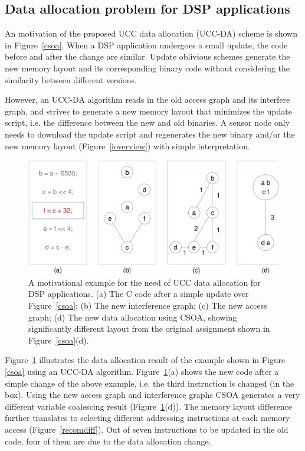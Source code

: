 \subsection{Data allocation problem for DSP applications}

An motivation of the proposed UCC data allocation (UCC-DA) scheme is shown in  Figure~\ref{csoa}. When a DSP 
application undergoes a small update, the code before and after the change are similar. Update oblivious schemes 
generate the new memory layout and its corresponding binary code without considering the similarity between different 
versions. 

However, an UCC-DA algorithm reads in the old access graph and its interfere graph, and strives to generate a new 
memory layout that minimizes the update script, i.e. the difference between the new and old binaries. A sensor node 
only needs to download the update script and regenerates the new binary and/or the new memory layout 
(Figure~\ref{ioverview}) with simple interpretation.

\begin{figure}[ht]
\begin{center}
\includegraphics[scale=0.5]{figures/updcsoa.eps}
\caption[An example for the need of UCC data allocation for DSP applications.]{A motivational example for the need of 
UCC data allocation for DSP applications.
(a) The C code after a simple update over Figure~\ref{csoa};
(b) The new interference graph;
(c) The new access graph;
(d) The new data allocation using CSOA, showing significantly different layout from the original assignment shown in 
Figure~\ref{csoa}(d).}
\label{updcsoa}
\end{center}
\vspace{-10mm}
\end{figure}
Figure~\ref{updcsoa} illustrates the data allocation result of the example shown in Figure \ref{csoa} using an UCC-DA 
algorithm.
Figure~\ref{updcsoa}(a) shows the new code after a simple change of the above example, i.e. the third instruction is 
changed (in the box). Using the new access graph and interference graphs CSOA generates a very different variable 
coalescing result (Figure~\ref{updcsoa}(d)). The memory layout difference further translates to selecting different 
addressing instructions at each memory access (Figure~\ref{recomdiff}). Out of seven instructions to be updated in the 
old code, four of them are due to the data allocation change.

